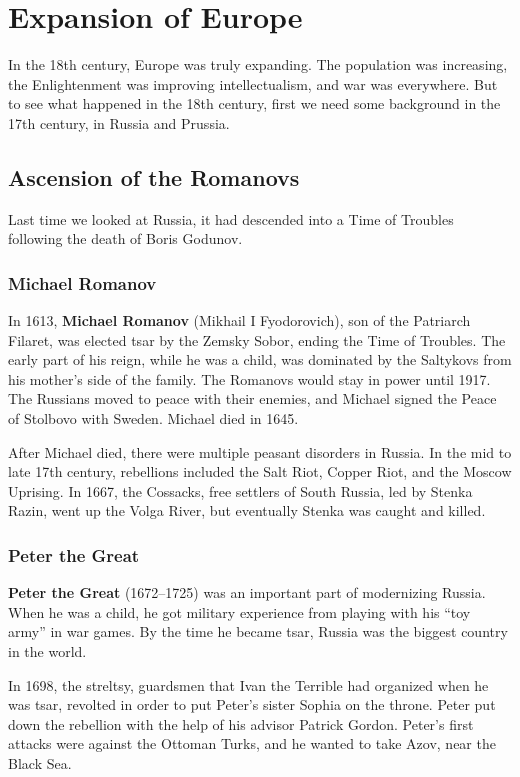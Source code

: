 \chapter{Expansion of Europe}

In the 18th century, Europe was truly expanding.
The population was increasing, the Enlightenment was improving intellectualism, and war was everywhere.
But to see what happened in the 18th century, first we need some background in the 17th century,
in Russia and Prussia.

\section{Ascension of the Romanovs}

Last time we looked at Russia, it had descended into a Time of Troubles following the death of Boris Godunov.

\subsection*{Michael Romanov}

In 1613, \textbf{Michael Romanov} (Mikhail I Fyodorovich), son of the Patriarch Filaret,
was elected tsar by the Zemsky Sobor, ending the Time of Troubles.
The early part of his reign, while he was a child,
was dominated by the Saltykovs from his mother's side of the family.
The Romanovs would stay in power until 1917.
The Russians moved to peace with their enemies, and Michael signed the Peace of Stolbovo with Sweden.
Michael died in 1645.

After Michael died, there were multiple peasant disorders in Russia.
In the mid to late 17th century, rebellions included the
Salt Riot, Copper Riot, and the Moscow Uprising.
In 1667, the Cossacks, free settlers of South Russia, led by Stenka Razin,
went up the Volga River, but eventually Stenka was caught and killed.

\subsection*{Peter the Great}

\textbf{Peter the Great} (1672--1725) was an important part of modernizing Russia.
When he was a child, he got military experience from playing with his ``toy army'' in war games.
By the time he became tsar, Russia was the biggest country in the world.

In 1698, the streltsy, guardsmen that Ivan the Terrible had organized when he was tsar,
revolted in order to put Peter's sister Sophia on the throne.
Peter put down the rebellion with the help of his advisor Patrick Gordon.
Peter's first attacks were against the Ottoman Turks, and he wanted to take Azov, near the Black Sea.

